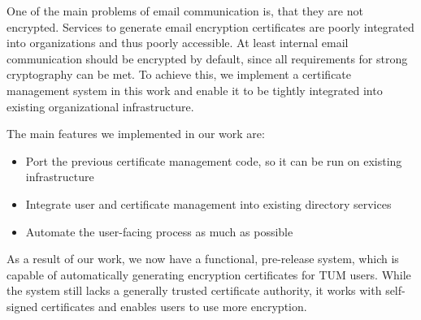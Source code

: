 \small

One of the main problems of email communication is, that they are not encrypted.
Services to generate email encryption certificates are poorly integrated into organizations and thus poorly
accessible.
At least internal email communication should be encrypted by default, since all requirements for strong cryptography can
be met. %
To achieve this, we implement a certificate management system in this work and enable it to be tightly integrated into
existing organizational infrastructure.

The main features we implemented in our work are:
\begin{itemize}
    \item Port the previous certificate management code, so it can be run on existing infrastructure
    \item Integrate user and certificate management into existing directory services
    \item Automate the user-facing process as much as possible
\end{itemize}

As a result of our work, we now have a functional, pre-release system, which is capable of automatically generating
encryption certificates for TUM users.
While the system still lacks a generally trusted certificate authority, it works with self-signed certificates and
enables users to use more encryption.
